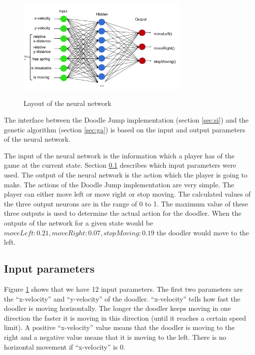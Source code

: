 \documentclass[a4paper,12pt,pagesize,headsepline,bibtotoc,titlepage,abstracton]{scrartcl}
\begin{document}
\begin{figure}[h]
\begin{center}
\includegraphics*[width=0.75\textwidth]{images/network_layout}\\
\caption{Layout of the neural network}
\label{abb:nl}
\end{center}
\end{figure}

The interface between the Doodle Jump implementation (section \ref{sec:si}) and the genetic algorithm (section \ref{sec:ga}) is based on the input and output parameters of the neural network.

The input of the neural network is the information which a player has of the game at the current state. Section \ref{sec:ip} describes which input parameters were used. The output of the neural network is the action which the player is going to make. The actions of the Doodle Jump implementation are very simple. The player can either move left or move right or stop moving. The calculated values of the three output neurons are in the range of 0 to 1. The maximum value of these three outputs is used to determine the actual action for the doodler. When the outputs of the network for a given state would be $moveLeft: 0.21, moveRight: 0.07, stopMoving: 0.19$ the doodler would move to the left.

\subsection{Input parameters}
\label{sec:ip}

Figure \ref{abb:nl} shows that we have 12 input parameters. The first two parameters are the ``x-velocity'' and ``y-velocity'' of the doodler. ``x-velocity'' tells how fast the doodler is moving horizontally. The longer the doodler keeps moving in one direction the faster it is moving in this direction (until it reaches a certain speed limit). A positive ``x-velocity'' value means that the doodler is moving to the right and a negative value means that it is moving to the left. There is no horizontal movement if ``x-velocity'' is 0.
\end{document}
